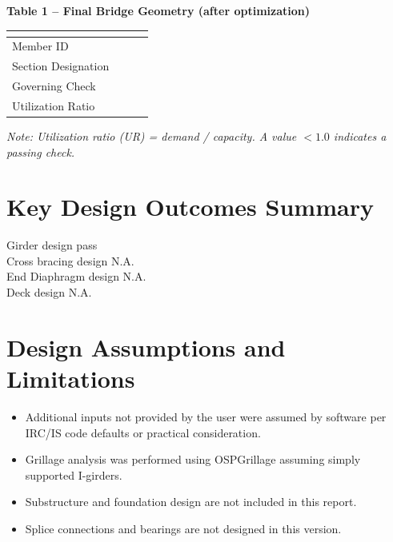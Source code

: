 \noindent\textbf{Table 1 -- Final Bridge Geometry (after optimization)}

\vspace{0.4em}
\noindent
\begin{tabular}{|C{2.8cm}|C{4.1cm}|C{4.1cm}|C{4.1cm}|}
\hline
  \textbf{} &
  \textbf{} &
  \textbf{} &
  \textbf{} \\
\hline
Member ID &  &  &  \\
\hline
Section Designation &  &  &  \\
\hline
Governing Check &  &  &  \\
\hline
Utilization Ratio &  &  &  \\
\hline
\end{tabular}

\vspace{0.4em}
\noindent\textit{Note: Utilization ratio (UR) = demand / capacity. A value $< 1.0$ indicates a passing check.}

\vspace{1em}

\section*{Key Design Outcomes Summary}
\label{sec:key-outcomes}

\noindent Girder design pass \\
Cross bracing design N.A. \\
End Diaphragm design N.A. \\
Deck design N.A.

\section*{Design Assumptions and Limitations}
\label{sec:assumptions}

\begin{itemize}
\item Additional inputs not provided by the user were assumed by software per IRC/IS code defaults or practical consideration.
\item Grillage analysis was performed using OSPGrillage assuming simply supported I-girders.
\item Substructure and foundation design are not included in this report.
\item Splice connections and bearings are not designed in this version.
\end{itemize}

\titleformat{\chapter}[block]{\normalfont\Large\bfseries\centering}{\thechapter}{1em}{}
\titlespacing*{\chapter}{0pt}{-30pt}{10pt}
